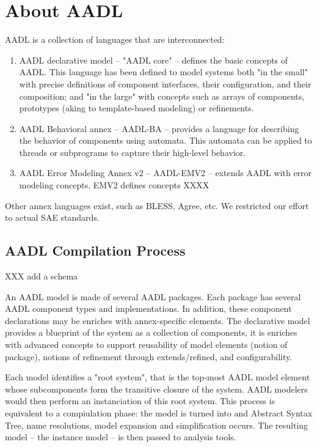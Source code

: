 
\section{About AADL}

AADL is a collection of languages that are interconnected:

\begin{enumerate}
    \item AADL declarative model -- "AADL core" -- defines the basic concepts of AADL. This language has been defined to model systems both "in the small" with precise definitions of component interfaces, their configuration, and their composition; and "in the large" with concepts such as arrays of components, prototypes (aking to template-based modeling) or refinements.
    \item AADL Behavioral annex -- AADL-BA -- provides a language for describing the behavior of components using automata. This automata can be applied to threads or subprograms to capture their high-level behavior.
    \item AADL Error Modeling Annex v2 -- AADL-EMV2 -- extends AADL with error modeling concepts. EMV2 defines concepts XXXX
\end{enumerate}

Other annex languages exist, such as BLESS, Agree, etc. We restricted our effort to actual SAE standards.

\subsection{AADL Compilation Process}

XXX add a schema

An AADL model is made of several AADL packages. Each package has several AADL component types and implementations. In addition, these component declarations may be enriches with annex-specific elements. The declarative model provides a blueprint of the system as a collection of components, it is enriches with advanced concepts to support reusability of model elements (notion of package), notions of refinement through extends/refined, and configurability.

Each model identifies a "root system", that is the top-most AADL model element whose subcomponents form the transitive closure of the system. AADL modelers would then perform an instanciation of this root system. This process is equivalent to a compiulation phase: the model is turned into and Abstract Syntax Tree, name resolutions, model expansion and simplification occurs. The resulting model -- the instance model -- is then passed to analysis tools.


